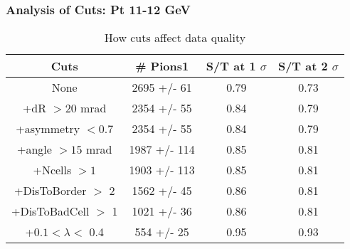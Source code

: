 \frame
{
\frametitle{Analysis of Cuts: Pt 11-12 GeV}
\begin{table}
\caption{How cuts affect data quality}
\centering
\begin{tabular}{c c c c}
\hline\hline
Cuts & \# Pions1 & S/T at 1 $\sigma$ & S/T at 2 $\sigma$ \\ [0.5ex]
\hline
None & 2695 +/-   61 & 0.79 & 0.73 \\ %
+dR $> 20$ mrad & 2354 +/-   55 & 0.84 & 0.79 \\ %
+asymmetry $< 0.7$ & 2354 +/-   55 & 0.84 & 0.79 \\ %
+angle $> 15$ mrad & 1987 +/-  114 & 0.85 & 0.81 \\ %
+Ncells $> 1$& 1903 +/-  113 & 0.85 & 0.81 \\ %
+DisToBorder $>$ 2 & 1562 +/-   45 & 0.86 & 0.81 \\ %
+DisToBadCell $>$ 1& 1021 +/-   36 & 0.86 & 0.81 \\ %
+$0.1 < \lambda <$ 0.4 &  554 +/-   25 & 0.95 & 0.93 \\ %
[1ex]
\hline
\end{tabular}
\label{table:nonlin}
\end{table}
}
